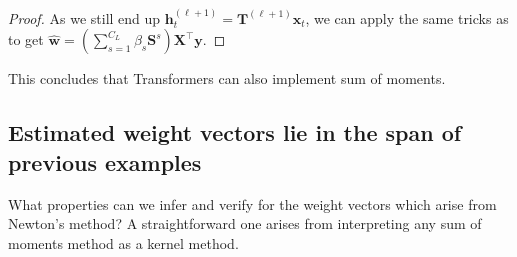 \documentclass[11pt]{article}
\theoremstyle{plain}
\theoremstyle{definition}
\theoremstyle{remark}
\renewcommand{\^}[1]{^{(#1)}}
\newcommand{\bx}{\boldsymbol{x}}
\newcommand{\bh}{\boldsymbol{h}}
\newcommand{\bX}{\boldsymbol{X}}
\newcommand{\by}{\boldsymbol{y}}
\newcommand{\bS}{\boldsymbol{S}}
\newcommand{\bT}{\boldsymbol{T}}
\newcommand{\bw}{\boldsymbol{w}}
\begin{document}
\begin{proof}
As we still end up $\bh_t^{(\ell+1)} = \bT^{(\ell+1)} \bx_t$, we can apply the same tricks as  to get $\displaystyle \hat{\bw} = \left(\sum_{s=1}^{C_{L}} \beta_s \bS^s\right) \bX^\top \by$.  
\end{proof}
This concludes that Transformers can also implement sum of moments.

\fi

\subsection{Estimated weight vectors lie in the span of previous examples} \label{app:span}

What properties can we infer and verify for the weight vectors which arise from Newton's method? A straightforward one arises from interpreting any sum of moments method as a kernel method. 
\end{document}
